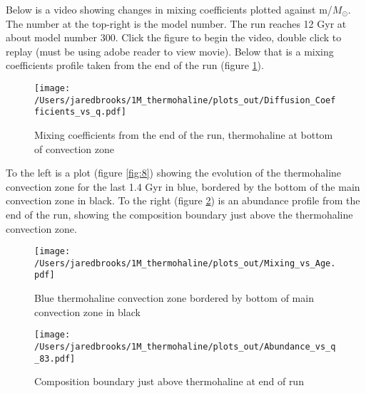\documentclass{article}
\begin{document}
        \pagebreak

        Below is a video showing changes in mixing coefficients plotted against m/$M_\odot$.  The number at the top-right is the model number.  The run reaches 12 Gyr at about model number 300.  Click the figure to begin the video, double click to replay (must be using adobe reader to view movie).  Below that is a mixing coefficients profile taken from the end of the run (figure \ref{fig:6}).

        \begin{figure}[H]
        \end{figure}

        \begin{figure}[H]
          \centering
          \texttt{[image: /Users/jaredbrooks/1M\_thermohaline/plots\_out/Diffusion\_Coefficients\_vs\_q.pdf]}
          \caption{Mixing coefficients from the end of the run, thermohaline at bottom of convection zone}
          \label{fig:6}
        \end{figure}

        \pagebreak

        To the left is a plot (figure \ref{fig:8}) showing the evolution of the thermohaline convection zone for the last 1.4 Gyr in blue, bordered by the bottom of the main convection zone in black.  To the right (figure \ref{fig:9}) is an abundance profile from the end of the run, showing the composition boundary just above the thermohaline convection zone.

        \begin{figure}[H]
          \begin{minipage}[b]{0.5\linewidth}
            \centering
            \texttt{[image: /Users/jaredbrooks/1M\_thermohaline/plots\_out/Mixing\_vs\_Age.pdf]}
            \caption{Blue thermohaline convection zone bordered by bottom of main convection zone in black}
            \label{fig:8}
          \end{minipage}
          \hspace{0cm}
          \begin{minipage}[b]{0.5\linewidth}
            \centering
            \texttt{[image: /Users/jaredbrooks/1M\_thermohaline/plots\_out/Abundance\_vs\_q\_83.pdf]}
            \caption{Composition boundary just above thermohaline at end of run}
            \label{fig:9}
          \end{minipage}
        \end{figure}
\end{document}

